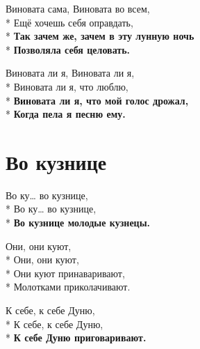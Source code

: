 \medskip

\begin{minipage}{\linewidth}
Виновата сама, Виновата во всем,\\*
Ещё хочешь себя оправдать,\\*
\textbf{Так зачем же, зачем в эту лунную ночь}\\*
\textbf{Позволяла себя целовать.}\\
\end{minipage}\par\medskip\nobreak

\medskip

\begin{minipage}{\linewidth}
Виновата ли я, Виновата ли я,\\*
Виновата ли я, что люблю,\\*
\textbf{Виновата ли я, что мой голос дрожал,}\\*
\textbf{Когда пела я песню ему.}\\
\end{minipage}

\vspace{\fill}\newpage

\section{Во кузнице}
\label{song:Во_кузнице}

\medskip

\begin{minipage}{\linewidth}
Во ку… во кузнице,\\*
Во ку… во кузнице,\\*
\textbf{Во кузнице молодые кузнецы.}\\
\end{minipage}\par\medskip\nobreak

\medskip

\begin{minipage}{\linewidth}
Они, они куют,\\*
Они, они куют,\\*
Они куют принаваривают,\\*
Молотками приколачивают.\\
\end{minipage}\par\medskip\nobreak

\medskip

\begin{minipage}{\linewidth}
К себе, к себе Дуню,\\*
К себе, к себе Дуню,\\*
\textbf{К себе Дуню приговаривают.}\\
\end{minipage}\par\medskip\nobreak

